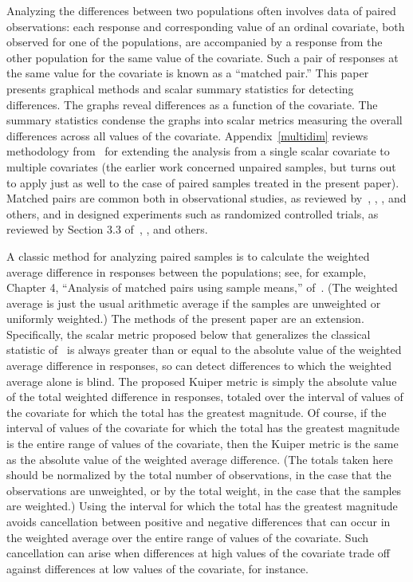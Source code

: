 \documentclass{article}
\begin{document}
Analyzing the differences between two populations often involves data
of paired observations: each response and corresponding value
of an ordinal covariate, both observed for one of the populations,
are accompanied by a response from the other population for the same value
of the covariate. Such a pair of responses at the same value for the covariate
is known as a ``matched pair.'' This paper presents graphical methods
and scalar summary statistics for detecting differences.
The graphs reveal differences as a function of the covariate.
The summary statistics condense the graphs into scalar metrics
measuring the overall differences across all values of the covariate.
Appendix~\ref{multidim} reviews methodology from~\cite{tygert_multidim}
for extending the analysis from a single scalar covariate
to multiple covariates (the earlier work concerned unpaired samples,
but turns out to apply just as well to the case of paired samples
treated in the present paper).
Matched pairs are common both in observational studies,
as reviewed by~\cite{rubin}, \cite{caliendo-kopeinig}, \cite{austin},
and others, and in designed experiments such as randomized controlled trials,
as reviewed by Section 3.3 of~\cite{cox-reid}, \cite{bai-romano-shaikh},
and others.

A classic method for analyzing paired samples is to calculate
the weighted average difference in responses between the populations;
see, for example, Chapter 4, ``Analysis of matched pairs using sample means,''
of~\cite{brown-hollander}. (The weighted average is just the usual arithmetic
average if the samples are unweighted or uniformly weighted.) The methods
of the present paper are an extension. Specifically, the scalar metric proposed
below that generalizes the classical statistic of~\cite{kuiper} is always
greater than or equal to the absolute value of the weighted average difference
in responses, so can detect differences to which the weighted average alone
is blind. The proposed Kuiper metric is simply the absolute value
of the total weighted difference in responses, totaled over the interval
of values of the covariate for which the total has the greatest magnitude.
Of course, if the interval of values of the covariate for which the total
has the greatest magnitude is the entire range of values of the covariate,
then the Kuiper metric is the same as the absolute value
of the weighted average difference. (The totals taken here should be normalized
by the total number of observations, in the case that the observations
are unweighted, or by the total weight, in the case that the samples
are weighted.)
Using the interval for which the total has the greatest magnitude
avoids cancellation between positive and negative differences
that can occur in the weighted average over the entire range of values
of the covariate. Such cancellation can arise when differences
at high values of the covariate trade off against differences at low values
of the covariate, for instance.
\end{document}
